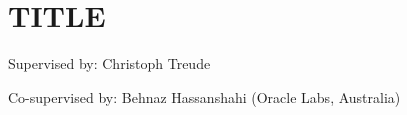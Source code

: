\section{TITLE}
\begin{frame}
  \titlepage
  \begin{center}
    Supervised by: 
    Christoph Treude 
    
    Co-supervised by: 
    Behnaz Hassanshahi (Oracle Labs, Australia)
  \end{center}
\end{frame}